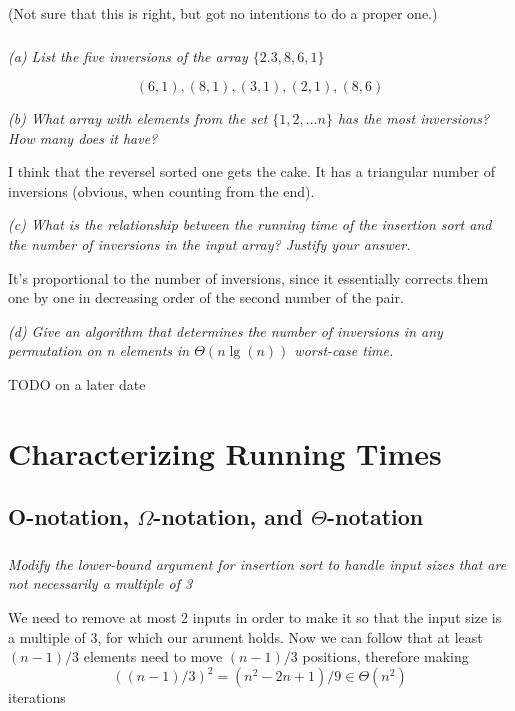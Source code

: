 \documentclass[11pt,oneside,titlepage]{book}
\begin{document}
(Not sure that this is right, but got no intentions to do a proper one.)

\subsection{}

\textit{(a) List the five inversions of the array $\{2. 3, 8, 6, 1\}$}

$$(6, 1), (8, 1), (3, 1), (2, 1), (8, 6)$$

\textit{(b) What array with elements from the set $\{1, 2, ... n\}$ has the most
  inversions? How many does it have?}

I think that the reversel sorted one gets the cake. It has a triangular number of inversions
(obvious, when counting from the end).

\textit{(c) What is the relationship between the running time of the insertion sort and the
  number of inversions in the input array? Justify your answer.}

It's proportional to the number of inversions, since it essentially corrects them one by one
in decreasing order of the second number of the pair.

\textit{(d) Give an algorithm that determines the number of inversions in any permutation
  on n elements in $\Theta(n \lg(n))$ worst-case time.}

TODO on a later date

\chapter{Characterizing Running Times}

\section{O-notation, $\Omega$-notation, and $\Theta$-notation}

\subsection{}

\textit{Modify the lower-bound argument for insertion sort to handle input sizes that are
  not necessarily a multiple of 3}

We need to remove at most 2 inputs in order to make it so that the input size is a multiple of 3,
for which our arument holds. Now we can follow that
at least$(n - 1)/3$ elements need to move $(n - 1)/3$ positions, therefore making
$$((n - 1)/3)^2 = (n^2 - 2n + 1)/9 \in \Theta(n^2)$$
iterations
\end{document}
